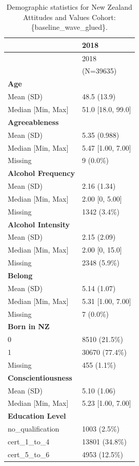\documentclass[
  single column]{article}
\begin{document}
\begin{longtable}[]{@{}ll@{}}
\caption{Demographic statistics for New Zealand Attitudes and Values
Cohort:
\{baseline\_wave\_glued\}.}\label{tbl-appendix-baseline}\tabularnewline
\toprule\noalign{}
& 2018 \\
\midrule\noalign{}
\endfirsthead
\toprule\noalign{}
& 2018 \\
\midrule\noalign{}
\endhead
\bottomrule\noalign{}
\endlastfoot
& (N=39635) \\
\textbf{Age} & \\
Mean (SD) & 48.5 (13.9) \\
Median {[}Min, Max{]} & 51.0 {[}18.0, 99.0{]} \\
\textbf{Agreeableness} & \\
Mean (SD) & 5.35 (0.988) \\
Median {[}Min, Max{]} & 5.47 {[}1.00, 7.00{]} \\
Missing & 9 (0.0\%) \\
\textbf{Alcohol Frequency} & \\
Mean (SD) & 2.16 (1.34) \\
Median {[}Min, Max{]} & 2.00 {[}0, 5.00{]} \\
Missing & 1342 (3.4\%) \\
\textbf{Alcohol Intensity} & \\
Mean (SD) & 2.15 (2.09) \\
Median {[}Min, Max{]} & 2.00 {[}0, 15.0{]} \\
Missing & 2348 (5.9\%) \\
\textbf{Belong} & \\
Mean (SD) & 5.14 (1.07) \\
Median {[}Min, Max{]} & 5.31 {[}1.00, 7.00{]} \\
Missing & 7 (0.0\%) \\
\textbf{Born in NZ} & \\
0 & 8510 (21.5\%) \\
1 & 30670 (77.4\%) \\
Missing & 455 (1.1\%) \\
\textbf{Conscientiousness} & \\
Mean (SD) & 5.10 (1.06) \\
Median {[}Min, Max{]} & 5.23 {[}1.00, 7.00{]} \\
\textbf{Education Level} & \\
no\_qualification & 1003 (2.5\%) \\
cert\_1\_to\_4 & 13801 (34.8\%) \\
cert\_5\_to\_6 & 4953 (12.5\%) \\

\end{longtable}
\end{document}
